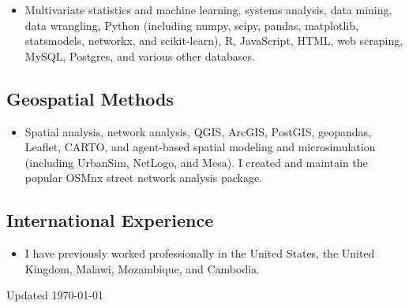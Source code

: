 \documentclass{academiccv}
\begin{document}
\begin{itemize}
\item Multivariate statistics and machine learning, systems analysis, data mining, data wrangling, Python (including numpy, scipy, pandas, matplotlib, statsmodels, networkx, and scikit-learn), R, JavaScript, HTML, web scraping, MySQL, Postgres, and various other databases.
\end{itemize}

\subsection*{Geospatial Methods}

\begin{itemize}
\item Spatial analysis, network analysis, QGIS, ArcGIS, PostGIS, geopandas, Leaflet, CARTO, and agent-based spatial modeling and microsimulation (including UrbanSim, NetLogo, and Mesa). I created and maintain the popular OSMnx street network analysis package.
\end{itemize}

\subsection*{International Experience}

\begin{itemize}
\item I have previously worked professionally in the United States, the United Kingdom, Malawi, Mozambique, and Cambodia.
\end{itemize}



\begin{center}
\vspace{6em}
Updated \monthyeardate\today
\end{center}
\end{document}
